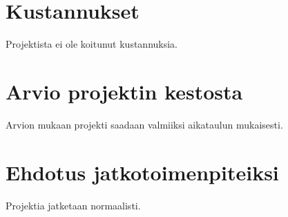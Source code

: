 \documentclass[a4paper, 12pt, finnish]{article}
\begin{document}
\section{Kustannukset}

Projektista ei ole koitunut kustannuksia.

\section{Arvio projektin kestosta}

Arvion mukaan projekti saadaan valmiiksi aikataulun mukaisesti.

\section{Ehdotus jatkotoimenpiteiksi}

Projektia jatketaan normaalisti.
\end{document}
